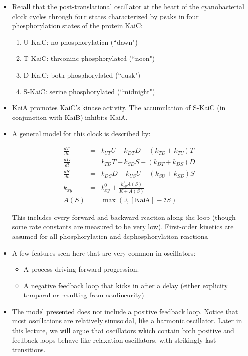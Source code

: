 \documentclass{article}
\begin{document}
\begin{itemize}
\item Recall that the post-translational oscillator at the heart of the cyanobacterial clock cycles through four states characterized by peaks in four phosphorylation states of the protein KaiC:
\begin{enumerate}
\item U-KaiC: no phosphorylation (``dawn")
\item T-KaiC: threonine phosphorylated (``noon")
\item D-KaiC: both phosphorylated (``dusk")
\item S-KaiC: serine phosphorylated (``midnight")
\end{enumerate}
\item KaiA promotes KaiC's kinase activity. The accumulation of S-KaiC (in conjunction with KaiB) inhibits KaiA.
\item A general model for this clock is described by:

\begin{eqnarray*}
\frac{dT}{dt} & = & k_{UT} U + k_{DT} D -\left(  k_{TD} + k_{TU} \right) T\\ 
\frac{dD}{dt} & = & k_{TD} T + k_{SD} S - \left(k_{DT} + k_{DS} \right) D\\
\frac{dS}{dt} & = &k_{DS} D +  k_{US} U - \left( k_{SU} + k_{SD} \right) S\\
k_{xy} & = & k_{xy}^0 + \frac{k_{xy}^A A(S)}{K + A(S)}\\
A(S) & = & \max \left(0, \left[ \textrm{KaiA} \right] - 2 S \right)
\end{eqnarray*}

This includes every forward and backward reaction along the loop (though some rate constants are measured to be very low). First-order kinetics are assumed for all phosphorylation and dephosphorylation reactions.

\item A few features seen here that are very common in oscillators:
\begin{itemize}
\item A process driving forward progression.
\item A negative feedback loop that kicks in after a delay (either explicity temporal or resulting from nonlinearity)
\end{itemize}
\item The model presented does not include a positive feedback loop. Notice that most oscillations are relatively sinusoidal, like a harmonic oscillator. Later in this lecture, we will argue that oscillators which contain both positive and feedback loops behave like relaxation oscillators, with strikingly fast transitions.
\end{itemize}
\end{document}
